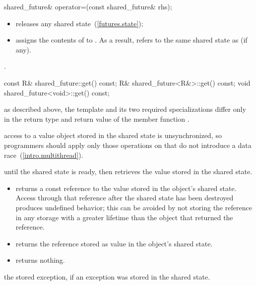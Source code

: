 %
%
\begin{itemdecl}
shared_future& operator=(const shared_future& rhs);
\end{itemdecl}

\begin{itemdescr}
\pnum
\effects
\begin{itemize}
\item
releases any shared state~(\ref{futures.state});

\item
assigns the contents of  to . \enternote As a result,
 refers to the same shared state as 
(if any). \exitnote
\end{itemize}

\pnum
\postconditions {}.
\end{itemdescr}

%
%
\begin{itemdecl}
const R& shared_future::get() const;
R& shared_future<R&>::get() const;
void shared_future<void>::get() const;
\end{itemdecl}

\begin{itemdescr}
\pnum
\realnote as described above, the template and its two required specializations differ only in
the return type and return value of the member function .

\pnum
\realnote access to a value object stored in the shared state is
unsynchronized, so programmers should apply only those operations on  that do not
introduce a data race~(\ref{intro.multithread}).

\pnum
\effects {} until the shared state is ready, then retrieves the
value stored in the shared state.

\pnum
\returns
\begin{itemize}
\item
{} returns a const reference to the value stored in the object's
shared state.
\enternote Access through that reference after the shared state has been
destroyed produces undefined behavior; this can be avoided by not storing the reference in any
storage with a greater lifetime than the  object that returned the
reference. \exitnote

\item
{} returns the reference stored as value in the object's
shared state.

\item
{} returns nothing.
\end{itemize}

\pnum
\throws the stored exception, if an exception was stored in the shared state.
\end{itemdescr}

